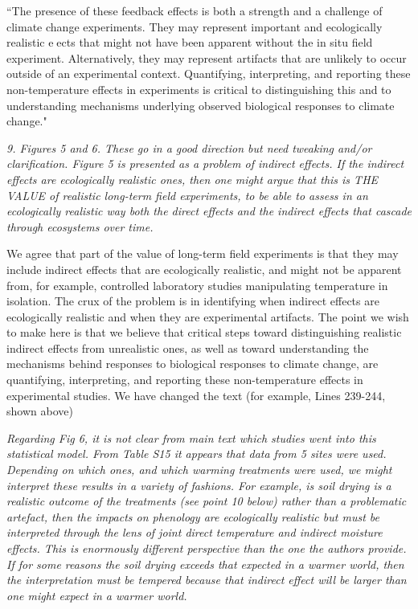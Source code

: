 \documentclass[11pt,a4paper]{letter}
\begin{document}
\begin{letter}{}
``The presence of these feedback effects is both a strength and a challenge of climate change experiments. They may represent important and ecologically realistic eects that might not have been apparent without the in situ field experiment. Alternatively, they may represent artifacts that are unlikely to occur outside of an experimental context. Quantifying, interpreting, and reporting these non-temperature effects in experiments is critical to distinguishing this and to understanding mechanisms underlying observed biological responses to climate change."
\\
\par \emph{9. Figures 5 and 6. These go in a good direction but need tweaking and/or clarification. Figure 5 is presented as a
problem of indirect effects. If the indirect effects are ecologically realistic ones, then one might
argue that this is THE VALUE of realistic long-term field experiments, to be able to assess in an
ecologically realistic way both the direct effects and the indirect effects that cascade through
ecosystems over time.}

We agree that part of the value of long-term field experiments is that they may include indirect effects that are ecologically realistic, and might not be apparent from, for example, controlled laboratory studies manipulating temperature in isolation. The crux of the problem is in identifying when indirect effects are ecologically realistic and when they are experimental artifacts. The point we wish to make here is that we believe that critical steps toward distinguishing realistic indirect effects from unrealistic ones, as well as toward understanding the mechanisms behind responses to biological responses to climate change, are quantifying, interpreting, and reporting these non-temperature effects in experimental studies. We have changed the text (for example, Lines 239-244, shown above)
\\
\par \emph{Regarding Fig 6, it is not clear from main text which studies went into this statistical model. From Table S15 it appears that data from 5 sites were used. Depending on which ones, and which warming treatments were used, we might interpret these results in a variety of fashions. For example, is soil drying is a realistic outcome of the treatments (see point 10 below) rather than a problematic artefact, then the impacts on phenology are ecologically realistic but must be interpreted through the lens of joint direct temperature and indirect moisture effects. This is enormously different perspective than the one the authors provide. If for some reasons the soil drying exceeds that expected in a warmer world, then the interpretation must be tempered because that indirect effect will be larger than one might expect in a warmer world.}


\end{letter}
\end{document}
